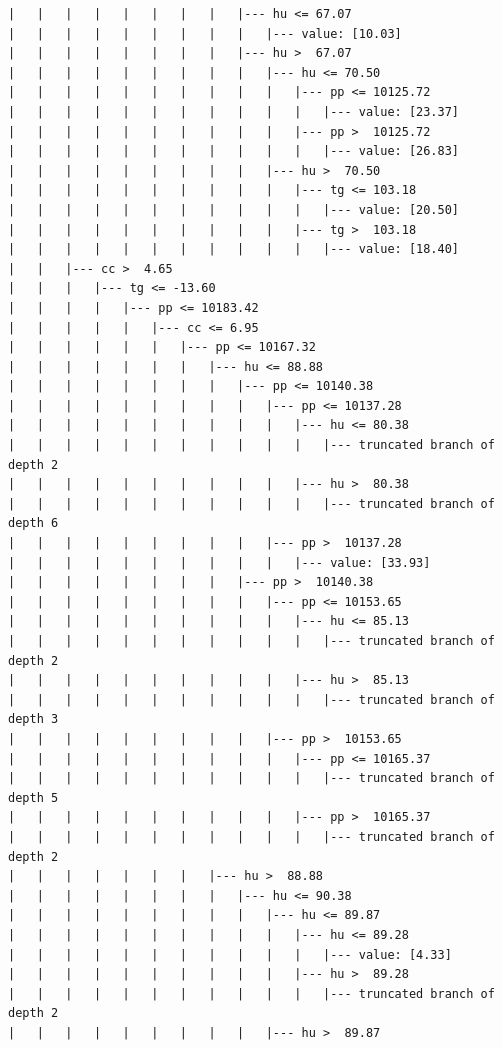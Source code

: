 \documentclass[UTF8, a4paper]{ctexart}
\begin{document}
\begin{lstlisting}
|   |   |   |   |   |   |   |   |--- hu <= 67.07
|   |   |   |   |   |   |   |   |   |--- value: [10.03]
|   |   |   |   |   |   |   |   |--- hu >  67.07
|   |   |   |   |   |   |   |   |   |--- hu <= 70.50
|   |   |   |   |   |   |   |   |   |   |--- pp <= 10125.72
|   |   |   |   |   |   |   |   |   |   |   |--- value: [23.37]
|   |   |   |   |   |   |   |   |   |   |--- pp >  10125.72
|   |   |   |   |   |   |   |   |   |   |   |--- value: [26.83]
|   |   |   |   |   |   |   |   |   |--- hu >  70.50
|   |   |   |   |   |   |   |   |   |   |--- tg <= 103.18
|   |   |   |   |   |   |   |   |   |   |   |--- value: [20.50]
|   |   |   |   |   |   |   |   |   |   |--- tg >  103.18
|   |   |   |   |   |   |   |   |   |   |   |--- value: [18.40]
|   |   |--- cc >  4.65
|   |   |   |--- tg <= -13.60
|   |   |   |   |--- pp <= 10183.42
|   |   |   |   |   |--- cc <= 6.95
|   |   |   |   |   |   |--- pp <= 10167.32
|   |   |   |   |   |   |   |--- hu <= 88.88
|   |   |   |   |   |   |   |   |--- pp <= 10140.38
|   |   |   |   |   |   |   |   |   |--- pp <= 10137.28
|   |   |   |   |   |   |   |   |   |   |--- hu <= 80.38
|   |   |   |   |   |   |   |   |   |   |   |--- truncated branch of depth 2
|   |   |   |   |   |   |   |   |   |   |--- hu >  80.38
|   |   |   |   |   |   |   |   |   |   |   |--- truncated branch of depth 6
|   |   |   |   |   |   |   |   |   |--- pp >  10137.28
|   |   |   |   |   |   |   |   |   |   |--- value: [33.93]
|   |   |   |   |   |   |   |   |--- pp >  10140.38
|   |   |   |   |   |   |   |   |   |--- pp <= 10153.65
|   |   |   |   |   |   |   |   |   |   |--- hu <= 85.13
|   |   |   |   |   |   |   |   |   |   |   |--- truncated branch of depth 2
|   |   |   |   |   |   |   |   |   |   |--- hu >  85.13
|   |   |   |   |   |   |   |   |   |   |   |--- truncated branch of depth 3
|   |   |   |   |   |   |   |   |   |--- pp >  10153.65
|   |   |   |   |   |   |   |   |   |   |--- pp <= 10165.37
|   |   |   |   |   |   |   |   |   |   |   |--- truncated branch of depth 5
|   |   |   |   |   |   |   |   |   |   |--- pp >  10165.37
|   |   |   |   |   |   |   |   |   |   |   |--- truncated branch of depth 2
|   |   |   |   |   |   |   |--- hu >  88.88
|   |   |   |   |   |   |   |   |--- hu <= 90.38
|   |   |   |   |   |   |   |   |   |--- hu <= 89.87
|   |   |   |   |   |   |   |   |   |   |--- hu <= 89.28
|   |   |   |   |   |   |   |   |   |   |   |--- value: [4.33]
|   |   |   |   |   |   |   |   |   |   |--- hu >  89.28
|   |   |   |   |   |   |   |   |   |   |   |--- truncated branch of depth 2
|   |   |   |   |   |   |   |   |   |--- hu >  89.87

\end{lstlisting}
\end{document}
